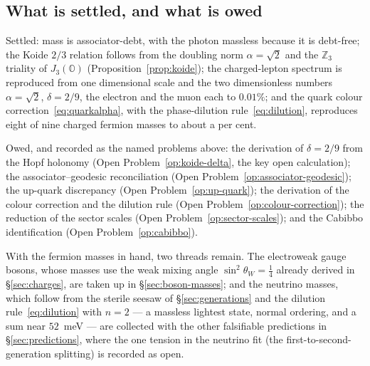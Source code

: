 \subsection{What is settled, and what is owed}

Settled: mass is associator-debt, with the photon massless because it is debt-free; the Koide $2/3$
relation follows from the doubling norm $\alpha=\sqrt2$ and the $\mathbb{Z}_3$ triality of $J_3(\mathbb{O})$
(Proposition~\ref{prop:koide}); the charged-lepton spectrum is reproduced from one dimensional scale
and the two dimensionless numbers $\alpha=\sqrt2$, $\delta=2/9$, the electron and the muon each to
$0.01\%$; and the quark colour correction~\eqref{eq:quarkalpha}, with the phase-dilution
rule~\eqref{eq:dilution}, reproduces eight of nine charged fermion masses to about a per cent.

Owed, and recorded as the named problems above: the derivation of $\delta = 2/9$ from the Hopf
holonomy (Open Problem~\ref{op:koide-delta}, the key open calculation); the associator--geodesic
reconciliation (Open Problem~\ref{op:associator-geodesic}); the up-quark discrepancy
(Open Problem~\ref{op:up-quark}); the derivation of the colour correction and the dilution rule
(Open Problem~\ref{op:colour-correction}); the reduction of the sector scales
(Open Problem~\ref{op:sector-scales}); and the Cabibbo identification
(Open Problem~\ref{op:cabibbo}).

With the fermion masses in hand, two threads remain. The electroweak gauge bosons, whose masses use
the weak mixing angle $\sin^2\theta_W = \tfrac14$ already derived in \S\ref{sec:charges}, are taken
up in \S\ref{sec:boson-masses}; and the neutrino masses, which follow from the sterile seesaw of
\S\ref{sec:generations} and the dilution rule~\eqref{eq:dilution} with $n = 2$ --- a massless
lightest state, normal ordering, and a sum near $52$~meV --- are collected with the other
falsifiable predictions in \S\ref{sec:predictions}, where the one tension in the neutrino fit (the
first-to-second-generation splitting) is recorded as open.
